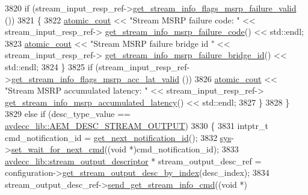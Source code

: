 \begin{DoxyCode}
3820             \textcolor{keywordflow}{if} (stream\_input\_resp\_ref->\hyperlink{classavdecc__lib_1_1stream__input__get__stream__info__response_a66f8db5ffff809dc5ae3b96c8d43eaf5}{get\_stream\_info\_flags\_msrp\_failure\_valid}
      ())
3821             \{
3822                 \hyperlink{cmd__line_8h_a0bc38ccc65c79ba06c6fcd7b4bf554c3}{atomic\_cout} << \textcolor{stringliteral}{"Stream MSRP failure code: "} << stream\_input\_resp\_ref->
      \hyperlink{classavdecc__lib_1_1stream__input__get__stream__info__response_ac6de72a4fceb3b08ac797689cd04c213}{get\_stream\_info\_msrp\_failure\_code}() << std::endl;
3823                 \hyperlink{cmd__line_8h_a0bc38ccc65c79ba06c6fcd7b4bf554c3}{atomic\_cout} << \textcolor{stringliteral}{"Stream MSRP failure bridge id "} << stream\_input\_resp\_ref->
      \hyperlink{classavdecc__lib_1_1stream__input__get__stream__info__response_a8873569631d5d34b648931d4a669cbfe}{get\_stream\_info\_msrp\_failure\_bridge\_id}() << std::endl;
3824             \}
3825             \textcolor{keywordflow}{if} (stream\_input\_resp\_ref->\hyperlink{classavdecc__lib_1_1stream__input__get__stream__info__response_a54f69ff970809ded4916bb29b7945c14}{get\_stream\_info\_flags\_msrp\_acc\_lat\_valid}
      ())
3826                 \hyperlink{cmd__line_8h_a0bc38ccc65c79ba06c6fcd7b4bf554c3}{atomic\_cout} << \textcolor{stringliteral}{"Stream MSRP accumulated latency: "} << stream\_input\_resp\_ref->
      \hyperlink{classavdecc__lib_1_1stream__input__get__stream__info__response_ae4d4e7b9a2c69eb93fc7e277cc14a968}{get\_stream\_info\_msrp\_accumulated\_latency}() << std::endl;
3827         \}
3828     \}
3829     \textcolor{keywordflow}{else} \textcolor{keywordflow}{if} (desc\_type\_value == \hyperlink{namespaceavdecc__lib_ac7b7d227e46bc72b63ee9e9aae15902fa3e5e9421e49598854000feaa2fe71464}{avdecc\_lib::AEM\_DESC\_STREAM\_OUTPUT})
3830     \{
3831         intptr\_t cmd\_notification\_id = \hyperlink{classcmd__line_a57486218387d1aa9d262eb7c176154ad}{get\_next\_notification\_id}();
3832         \hyperlink{classcmd__line_a485db4800e331cb4052c447fdf5d154e}{sys}->\hyperlink{classavdecc__lib_1_1system_a26b769584f10225077da47583edda33e}{set\_wait\_for\_next\_cmd}((\textcolor{keywordtype}{void} *)cmd\_notification\_id);
3833         \hyperlink{classavdecc__lib_1_1stream__output__descriptor}{avdecc\_lib::stream\_output\_descriptor} * stream\_output\_desc\_ref =
       configuration->\hyperlink{classavdecc__lib_1_1configuration__descriptor_a300ea5957342e2e9579318135da02856}{get\_stream\_output\_desc\_by\_index}(desc\_index);
3834         stream\_output\_desc\_ref->\hyperlink{classavdecc__lib_1_1stream__output__descriptor_af1004affeb5ff3cf8bb9356ebcaa3aae}{send\_get\_stream\_info\_cmd}((\textcolor{keywordtype}{void} *)

\end{DoxyCode}
